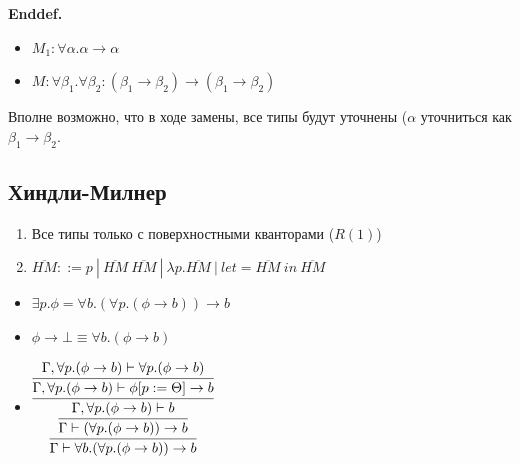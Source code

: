 \documentclass[12pt]{article}
\begin{document}
\noindent\textbf{Enddef.} 

\begin{paracol}{2}
\begin{itemize}[label={}]
    \item $M_1 : \forall \alpha . \alpha \rightarrow \alpha$
    \item $M : \forall \beta_1.\forall \beta_2: (\beta_1 \rightarrow \beta_2) \rightarrow (\beta_1 \rightarrow \beta_2)$
\end{itemize}
\switchcolumn
Вполне возможно, что в ходе замены, все типы будут уточнены ($\alpha$ уточниться как $\beta_1 \rightarrow \beta_2$.
\end{paracol}


\subsection{Хиндли-Милнер}

\begin{enumerate}
    \item Все типы только с поверхностными кванторами ($R(1)$)
    \item $\overline{HM} ::= p\ |\ \overline{HM}\ \overline{HM}\ |\ \lambda p. \overline{HM}\ |\ let =  \overline{HM}\ in\ \overline{HM}$
\end{enumerate}

\begin{itemize}
    \item $\exists p.\phi = \forall b.(\forall p. (\phi \rightarrow b)) \rightarrow b$
    \item $\phi \rightarrow \bot \equiv \forall b. (\phi \rightarrow b)$
    
    \item $\vcenter{\infer[]{\Gamma \vdash \forall b.(\forall p.(\phi \rightarrow b)) \rightarrow b}{\infer{\Gamma \vdash (\forall p. (\phi \rightarrow b)) \rightarrow b}{\infer{\Gamma, \forall p. (\phi \rightarrow b) \vdash b}{\infer{\Gamma, \forall p. (\phi \rightarrow b) \vdash \phi [p := \Theta] \rightarrow b}{\Gamma, \forall p. (\phi \rightarrow b) \vdash \forall p.(\phi \rightarrow b)}}}}}$
\end{itemize}
\end{document}
